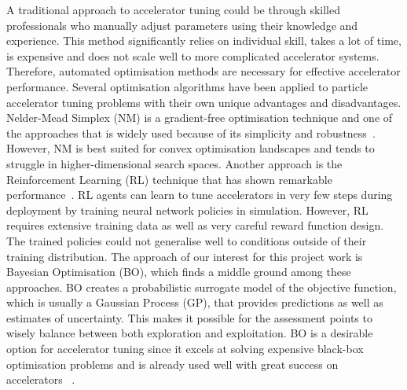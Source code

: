 A traditional approach to accelerator tuning could be through skilled professionals who manually adjust 
parameters using their knowledge and experience. This method significantly relies 
on individual skill, takes a lot of time, is expensive and does not scale well to more complicated accelerator 
systems. Therefore, automated optimisation methods are necessary for effective accelerator performance.
Several optimisation algorithms have been applied to particle accelerator tuning problems with their own unique 
advantages and disadvantages. Nelder-Mead Simplex (NM) is a gradient-free optimisation technique and one of the approaches 
that is widely used because of its simplicity and robustness~\cite{nelder1965simplex}. However, NM is best suited for convex optimisation landscapes and tends to struggle in higher-dimensional search spaces. Another approach is the Reinforcement Learning (RL) 
technique that has shown remarkable performance~\cite{kaiser2024rl}. RL agents can learn to tune accelerators in very few steps during deployment 
by training neural network policies in simulation. However, RL requires extensive training data as well as very careful reward 
function design. The trained policies could not generalise well to conditions outside of their training distribution. The approach 
of our interest for this project work is Bayesian Optimisation (BO), which finds a middle ground among these approaches. BO creates 
a probabilistic surrogate model of the objective function, which is usually a Gaussian Process (GP), that provides predictions 
as well as estimates of uncertainty. This makes it possible for the assessment points to wisely balance between both exploration and exploitation. BO is 
a desirable option for accelerator tuning since it excels at solving expensive black-box optimisation problems and is already used well with great 
success on accelerators~\cite{roussel2024bo,jalas2021bolaserplasma,Duris2020bofreelectron} . \

